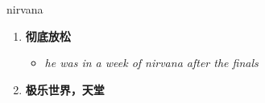 
\begin{frame}
{\huge nirvana}
\begin{center}
\begin{enumerate}\Large
  \item \textbf{彻底放松}
  \begin{itemize}
    \item \em{\Large{he was in a week of nirvana after the finals}}
  \end{itemize}
  \item \textbf{极乐世界，天堂}
\end{enumerate}
\end{center}
\end{frame}
